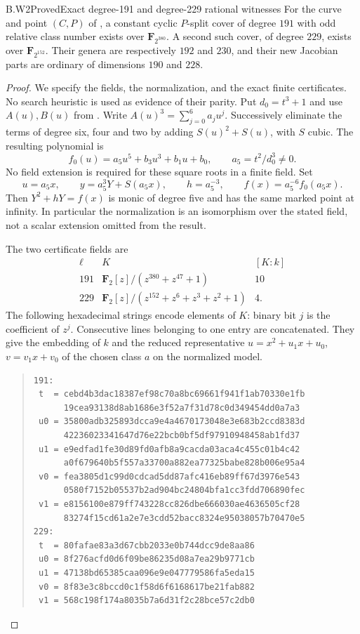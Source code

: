 \begin{claim}{B.W2}{Proved}{Exact degree-191 and degree-229 rational witnesses}
For the curve and point $(C,P)$ of , a constant
cyclic $P$-split cover of degree $191$ with odd relative class
number exists over $\mathbf F_{2^{380}}$. A second such cover,
of degree $229$, exists over $\mathbf F_{2^{152}}$.
Their genera are respectively $192$ and $230$, and their new
Jacobian parts are ordinary of dimensions $190$ and $228$.
\end{claim}
\begin{proof}
We specify the fields, the normalization, and the exact finite
certificates. No search heuristic is used as evidence of their parity.
Put $d_0=t^3+1$ and use $A(u),B(u)$ from .
Write $A(u)^3=\sum_{j=0}^6 a_j u^j$. Successively eliminate the
terms of degree six, four and two by adding $S(u)^2+S(u)$, with
$S$ cubic. The resulting polynomial is
\[
 f_0(u)=a_5u^5+b_3u^3+b_1u+b_0,
 \qquad a_5=t^2/d_0^3\ne0.
\]
No field extension is required for these square roots in a finite
field. Set
\[
 u=a_5x,\qquad y=a_5^3Y+S(a_5x),\qquad
 h=a_5^{-3},\qquad f(x)=a_5^{-6}f_0(a_5x).
\]
Then $Y^2+hY=f(x)$ is monic of degree five and has the same marked
point at infinity. In particular the normalization is an isomorphism
over the stated field, not a scalar extension omitted from the result.

The two certificate fields are
\[
 \begin{array}{c|c|c}
 \ell&K&[K:k]\\ \hline
 191&\mathbf F_2[z]/(z^{380}+z^{47}+1)&10\\
 229&\mathbf F_2[z]/(z^{152}+z^6+z^3+z^2+1)&4.
 \end{array}
\]
The following hexadecimal strings encode elements of $K$: binary
bit $j$ is the coefficient of $z^j$. Consecutive lines belonging
to one entry are concatenated. They give the embedding of $k$ and
the reduced representative $u=x^2+u_1x+u_0$, $v=v_1x+v_0$ of the
chosen class $a$ on the normalized model.
\begin{quote}\small
\begin{verbatim}
191:
 t  = cebd4b3dac18387ef98c70a8bc69661f941f1ab70330e1fb
      19cea93138d8ab1686e3f52a7f31d78c0d349454dd0a7a3
 u0 = 35800adb325893dcca9e4a4670173048e3e683b2ccd8383d
      42236023341647d76e22bcb0bf5df97910948458ab1fd37
 u1 = e9edfad1fe30d89fd0afb8a9cacda03aca4c455c01b4c42
      a0f679640b5f557a33700a882ea77325babe828b006e95a4
 v0 = fea3805d1c99d0cdcad5dd87afc416eb89ff67d3976e543
      0580f7152b05537b2ad904bc24804bfa1cc3fdd706890fec
 v1 = e8156100e879ff743228cc826dbe666030ae4636505cf28
      83274f15cd61a2e7e3cdd52bacc8324e95038057b70470e5
229:
 t  = 80fafae83a3d67cbb2033e0b744dcc9de8aa86
 u0 = 8f276acfd0d6f09be86235d08a7ea29b9771cb
 u1 = 47138bd65385caa096e9e047779586fa5eda15
 v0 = 8f83e3c8bccd0c1f58d6f6168617be21fab882
 v1 = 568c198f174a8035b7a6d31f2c28bce57c2db0
\end{verbatim}
\end{quote}


\end{proof}
